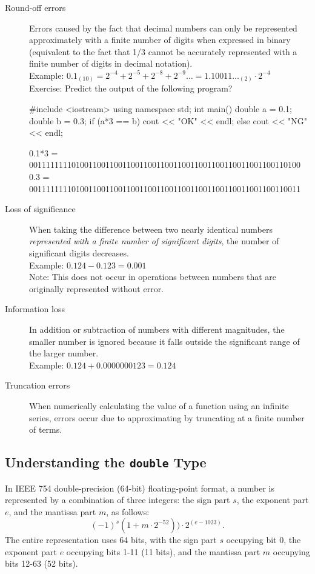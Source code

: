 \begin{description}
\item[Round-off errors] Errors caused by the fact that decimal numbers can only be represented approximately with a finite number of digits when expressed in binary (equivalent to the fact that 1/3 cannot be accurately represented with a finite number of digits in decimal notation).
  \\
  Example: $0.1_{(10)} = 2^{-4} + 2^{-5}+2^{-8}+2^{-9}\ldots =
  1.10011\ldots_{(2)}\cdot 2^{-4}$\\
  Exercise: Predict the output of the following program?
  \begin{cbox}
#include <iostream>
using namespace std;
int main() {
  double a = 0.1;
  double b = 0.3;
  if (a*3 == b) cout << "OK" << endl;
  else cout << "NG" << endl;
}    
  \end{cbox}
  \begin{terminal}
0.1*3 = 0011111111010011001100110011001100110011001100110011001100110100
  0.3 = 0011111111010011001100110011001100110011001100110011001100110011    
  \end{terminal}
\item[Loss of significance] When taking the difference between two nearly identical numbers \emph{represented with a finite number of significant digits}, the number of significant digits decreases.
  \\
  Example: $0.124 - 0.123 = 0.001$\\
Note: This does not occur in operations between numbers that are originally represented without error.
\item[Information loss] In addition or subtraction of numbers with different magnitudes, the smaller number is ignored because it falls outside the significant range of the larger number.
  \\
  Example: $0.124 + 0.0000000123 = 0.124$
\item[Truncation errors] When numerically calculating the value of a function using an infinite series, errors occur due to approximating by truncating at a finite number of terms.
\end{description}

\subsection{Understanding the \texttt{double} Type}
In IEEE 754 double-precision (64-bit) floating-point format, a number is represented by a combination of three integers: the sign part $s$, the exponent part $e$, and the mantissa part $m$, as follows:
\begin{equation}
(-1)^s (1+m \cdot 2^{-52})) \cdot 2^{(e-1023)}.\label{eq:ieee64}
\end{equation}
The entire representation uses 64 bits, with the sign part $s$ occupying bit 0, the exponent part $e$ occupying bits 1-11 (11 bits), and the mantissa part $m$ occupying bits 12-63 (52 bits).

